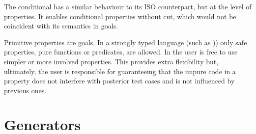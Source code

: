 The conditional  has a similar behaviour to its ISO
\Prolog{} counterpart, but at the level of \plqc{} properties.
%
It enables conditional properties without cut, which would not be
coincident with its semantics in \Prolog{} goals.





Primitive properties are \Prolog{} goals.
In a strongly typed language (such as \Haskell{}))
only
safe properties, pure functions or predicates, are allowed.
%
%
%
In \plqc{} the user is
free to use simpler or more involved
properties.
%
This provides extra flexibility but, ultimately, the user
is %
responsible for guaranteeing that the impure code in a property
does not interfere with posterior test
cases and is not influenced by previous ones.


\section{Generators}
\label{sec:generators}

